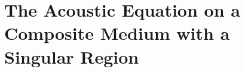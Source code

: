 \chapter{The Acoustic Equation on a Composite Medium with a Singular Region} \label{ch:SingInc}











%





\begin{subappendices}



%

\end{subappendices}
